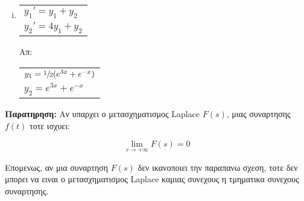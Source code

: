 \begin{enumerate}
\begin{enumerate}[i)]

\item \begin{tabular}{l} $y_1'=y_1+y_2$ \\ $y_2'=4y_1+y_2$\end{tabular} \hfill Απ: \begin{tabular}{l} $y_1=\sfrac{1}{2}(e^{3x}+e^{-x})$ \\ $y_2=e^{3x}+e^{-x}$\end{tabular}


\end{enumerate}

\end{enumerate}

\vspace{\baselineskip}

\textbf{Παρατηρηση:} Αν υπαρχει ο μετασχηματισμος Laplace $F(s)$, μιας συναρτησης $f(t)$ τοτε ισχυει:

\[
\lim\limits_{s\to+\infty}F(s)=0
\]

Επομενως, αν μια συναρτηση $F(s)$ δεν ικανοποιει την παραπανω σχεση, τοτε δεν μπορει να ειναι ο μετασχηματισμος Laplace καμιας συνεχους η τμηματικα συνεχους συναρτησης.



